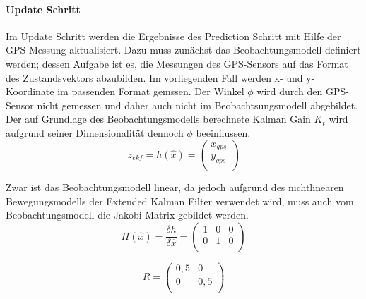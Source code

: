 \documentclass[11pt]{article}
\begin{document}
\paragraph{Update Schritt}
Im Update Schritt werden die Ergebnisse des Prediction Schritt mit Hilfe der GPS-Messung aktualisiert. Dazu muss zunächst das Beobachtungsmodell definiert werden; dessen Aufgabe ist es, die Messungen des GPS-Sensors auf das Format des Zustandsvektors abzubilden. Im vorliegenden Fall werden x- und y-Koordinate im passenden Format gemssen. Der Winkel $\phi$ wird durch den GPS-Sensor nicht gemessen und daher auch nicht im Beobachtsungsmodell abgebildet. Der auf Grundlage des Beobachtungsmodells berechnete Kalman Gain $K_t$ wird aufgrund seiner Dimensionalität dennoch $\phi$ beeinflussen.
\begin{equation}\label{EKF-Observation-Model}
	z_{ekf} = h(\hat{x}) = \begin{pmatrix}
		x_{gps} \\
		y_{gps} \\
	\end{pmatrix}
\end{equation}

Zwar ist das Beobachtungsmodell linear, da jedoch aufgrund des nichtlinearen Bewegungsmodells der Extended Kalman Filter verwendet wird, muss auch vom Beobachtungsmodell die Jakobi-Matrix gebildet werden.
\begin{equation}\label{EKF-Observation-Model-Jakobi-Matrix}
	H(\hat{x})= \frac{\delta h}{\delta \hat{x}} = \begin{pmatrix}
		1 & 0 & 0 \\
		0 & 1 & 0 \\
	\end{pmatrix}
\end{equation}

\begin{equation}\label{GPS-Messungenauigkeits-Matrix}
	R = \begin{pmatrix}
		0,5 & 0 \\
		0 & 0,5 \\
	\end{pmatrix}
\end{equation}
\end{document}
